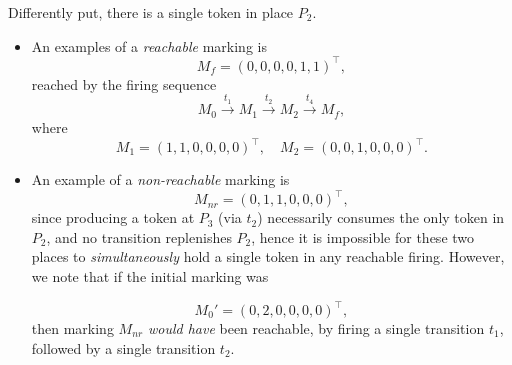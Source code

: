 Differently put, there is a single token in place $P_2$.


\begin{itemize}
	\item An examples of a \emph{reachable} marking is
	\[
	M_f = (0,0,0,0,1,1)^\top,
	\]
	reached by the firing sequence
	\[
	M_0 \xrightarrow{t_1} M_1
	\xrightarrow{t_2} M_2
	\xrightarrow{t_4} M_f,
	\]
	where
	\[
	M_1 = (1,1,0,0,0,0)^\top,
	\quad
	M_2 = (0,0,1,0,0,0)^\top.
	\]
	\item An example of a \emph{non-reachable} marking is
	\[
	M_{nr} = (0,1,1,0,0,0)^\top,
	\]
	since producing a token at \(P_3\) (via \(t_2\)) necessarily consumes the only token in \(P_2\), and no transition replenishes \(P_2\), hence it is impossible for these two places to \textit{simultaneously} hold a single token in any reachable firing. However, we note that if the initial marking was 
	
	\[
	M_0' = (0,2,0,0,0,0)^\top,
	\]
	then marking $M_{nr}$ \textit{would have} been reachable, by firing a single transition $t_1$, followed by a single transition $t_2$.
\end{itemize}






